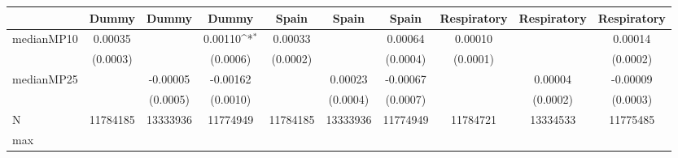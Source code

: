 {
\def\sym#1{\ifmmode^{#1}\else\(^{#1}\)\fi}
\begin{tabular}{l*{9}{c}}
\toprule
            &\multicolumn{1}{c}{Dummy}&\multicolumn{1}{c}{Dummy}&\multicolumn{1}{c}{Dummy}&\multicolumn{1}{c}{Spain}&\multicolumn{1}{c}{Spain}&\multicolumn{1}{c}{Spain}&\multicolumn{1}{c}{Respiratory}&\multicolumn{1}{c}{Respiratory}&\multicolumn{1}{c}{Respiratory}\\
\midrule
medianMP10  &     0.00035         &                     &     0.00110\sym{*}  &     0.00033         &                     &     0.00064         &     0.00010         &                     &     0.00014         \\
            &    (0.0003)         &                     &    (0.0006)         &    (0.0002)         &                     &    (0.0004)         &    (0.0001)         &                     &    (0.0002)         \\
medianMP25  &                     &    -0.00005         &    -0.00162         &                     &     0.00023         &    -0.00067         &                     &     0.00004         &    -0.00009         \\
            &                     &    (0.0005)         &    (0.0010)         &                     &    (0.0004)         &    (0.0007)         &                     &    (0.0002)         &    (0.0003)         \\
\midrule
N           &    11784185         &    13333936         &    11774949         &    11784185         &    13333936         &    11774949         &    11784721         &    13334533         &    11775485         \\
max         &                     &                     &                     &                     &                     &                     &                     &                     &                     \\
\bottomrule
\end{tabular}
}
